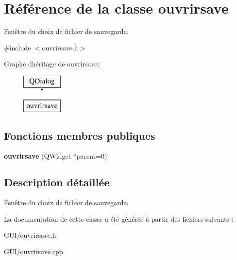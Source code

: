 \hypertarget{classouvrirsave}{}\section{Référence de la classe ouvrirsave}
\label{classouvrirsave}


Fenêtre du choix de fichier de sauvegarde.  




{\ttfamily \#include $<$ouvrirsave.\+h$>$}

Graphe d\textquotesingle{}héritage de ouvrirsave\+:\begin{figure}[H]
\begin{center}
\leavevmode
\includegraphics[height=2.000000cm]{classouvrirsave}
\end{center}
\end{figure}
\subsection*{Fonctions membres publiques}
\begin{DoxyCompactItemize}
\item 
\hypertarget{classouvrirsave_a3dd0e7eeb7cd7bebae55f167ee85eb29}{}{\bfseries ouvrirsave} (Q\+Widget $\ast$parent=0)\label{classouvrirsave_a3dd0e7eeb7cd7bebae55f167ee85eb29}

\end{DoxyCompactItemize}


\subsection{Description détaillée}
Fenêtre du choix de fichier de sauvegarde. 

La documentation de cette classe a été générée à partir des fichiers suivants \+:\begin{DoxyCompactItemize}
\item 
G\+U\+I/ouvrirsave.\+h\item 
G\+U\+I/ouvrirsave.\+cpp\end{DoxyCompactItemize}
